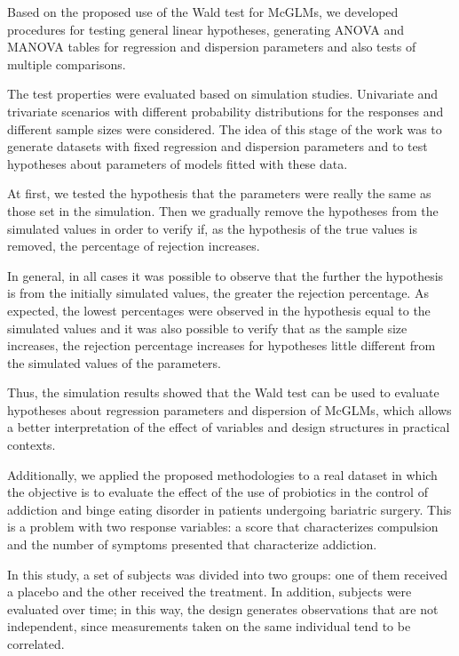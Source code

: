 \documentclass[AMA,STIX1COL]{WileyNJD-v2}
\begin{document}
Based on the proposed use of the Wald test for McGLMs, we developed procedures for testing general linear hypotheses, generating ANOVA and MANOVA tables for regression and dispersion parameters and also tests of multiple comparisons.

The test properties were evaluated based on simulation studies. Univariate and trivariate scenarios with different probability distributions for the responses and different sample sizes were considered. The idea of this stage of the work was to generate datasets with fixed regression and dispersion parameters and to test hypotheses about parameters of models fitted with these data. 

At first, we tested the hypothesis that the parameters were really the same as those set in the simulation. Then we gradually remove the hypotheses from the simulated values in order to verify if, as the hypothesis of the true values is removed, the percentage of rejection increases. 

In general, in all cases it was possible to observe that the further the hypothesis is from the initially simulated values, the greater the rejection percentage. As expected, the lowest percentages were observed in the hypothesis equal to the simulated values and it was also possible to verify that as the sample size increases, the rejection percentage increases for hypotheses little different from the simulated values of the parameters.

Thus, the simulation results showed that the Wald test can be used to evaluate hypotheses about regression parameters and dispersion of McGLMs, which allows a better interpretation of the effect of variables and design structures in practical contexts.

Additionally, we applied the proposed methodologies to a real dataset in which the objective is to evaluate the effect of the use of probiotics in the control of addiction and binge eating disorder in patients undergoing bariatric surgery. This is a problem with two response variables: a score that characterizes compulsion and the number of symptoms presented that characterize addiction.

In this study, a set of subjects was divided into two groups: one of them received a placebo and the other received the treatment. In addition, subjects were evaluated over time; in this way, the design generates observations that are not independent, since measurements taken on the same individual tend to be correlated.
\end{document}
